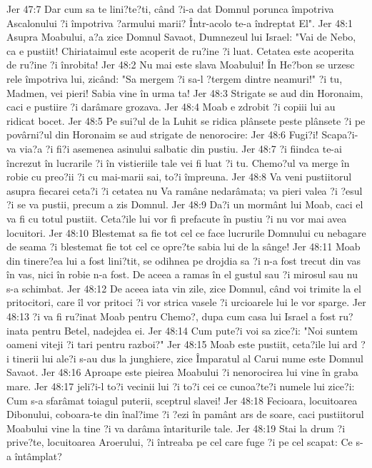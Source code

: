 Jer 47:7  Dar cum sa te lini?te?ti, când ?i-a dat Domnul porunca împotriva Ascalonului ?i împotriva ?armului marii? Într-acolo te-a îndreptat El".
Jer 48:1  Asupra Moabului, a?a zice Domnul Savaot, Dumnezeul lui Israel: "Vai de Nebo, ca e pustiit! Chiriataimul este acoperit de ru?ine ?i luat. Cetatea este acoperita de ru?ine ?i înrobita!
Jer 48:2  Nu mai este slava Moabului! În He?bon se urzesc rele împotriva lui, zicând: "Sa mergem ?i sa-l ?tergem dintre neamuri!" ?i tu, Madmen, vei pieri! Sabia vine în urma ta!
Jer 48:3  Strigate se aud din Horonaim, caci e pustiire ?i darâmare grozava.
Jer 48:4  Moab e zdrobit ?i copiii lui au ridicat bocet.
Jer 48:5  Pe sui?ul de la Luhit se ridica plânsete peste plânsete ?i pe povârni?ul din Horonaim se aud strigate de nenorocire:
Jer 48:6  Fugi?i! Scapa?i-va via?a ?i fi?i asemenea asinului salbatic din pustiu.
Jer 48:7  ?i fiindca te-ai încrezut în lucrarile ?i în vistieriile tale vei fi luat ?i tu. Chemo?ul va merge în robie cu preo?ii ?i cu mai-marii sai, to?i împreuna.
Jer 48:8  Va veni pustiitorul asupra fiecarei ceta?i ?i cetatea nu Va ramâne nedarâmata; va pieri valea ?i ?esul ?i se va pustii, precum a zis Domnul.
Jer 48:9  Da?i un mormânt lui Moab, caci el va fi cu totul pustiit. Ceta?ile lui vor fi prefacute în pustiu ?i nu vor mai avea locuitori.
Jer 48:10  Blestemat sa fie tot cel ce face lucrurile Domnului cu nebagare de seama ?i blestemat fie tot cel ce opre?te sabia lui de la sânge!
Jer 48:11  Moab din tinere?ea lui a fost lini?tit, se odihnea pe drojdia sa ?i n-a fost trecut din vas în vas, nici în robie n-a fost. De aceea a ramas în el gustul sau ?i mirosul sau nu s-a schimbat.
Jer 48:12  De aceea iata vin zile, zice Domnul, când voi trimite la el pritocitori, care îl vor pritoci ?i vor strica vasele ?i urcioarele lui le vor sparge.
Jer 48:13  ?i va fi ru?inat Moab pentru Chemo?, dupa cum casa lui Israel a fost ru?inata pentru Betel, nadejdea ei.
Jer 48:14  Cum pute?i voi sa zice?i: "Noi suntem oameni viteji ?i tari pentru razboi?"
Jer 48:15  Moab este pustiit, ceta?ile lui ard ?i tinerii lui ale?i s-au dus la junghiere, zice Împaratul al Carui nume este Domnul Savaot.
Jer 48:16  Aproape este pieirea Moabului ?i nenorocirea lui vine în graba mare.
Jer 48:17  jeli?i-l to?i vecinii lui ?i to?i cei ce cunoa?te?i numele lui zice?i: Cum s-a sfarâmat toiagul puterii, sceptrul slavei!
Jer 48:18  Fecioara, locuitoarea Dibonului, coboara-te din înal?ime ?i ?ezi în pamânt ars de soare, caci pustiitorul Moabului vine la tine ?i va darâma întariturile tale.
Jer 48:19  Stai la drum ?i prive?te, locuitoarea Aroerului, ?i întreaba pe cel care fuge ?i pe cel scapat: Ce s-a întâmplat?
